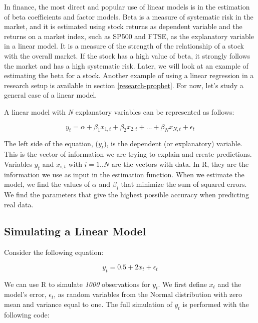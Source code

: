 \documentclass[11pt,]{book}
\begin{document}
In finance, the most direct and popular use of linear models is in the
estimation of beta coefficients and factor models. Beta is a measure of
systematic risk in the market, and it is estimated using stock returns
as dependent variable and the returns on a market index, such as SP500
and FTSE, as the explanatory variable in a linear model. It is a measure
of the strength of the relationship of a stock with the overall market.
If the stock has a high value of beta, it strongly follows the market
and has a high systematic risk. Later, we will look at an example of
estimating the beta for a stock. Another example of using a linear
regression in a research setup is available in section
\ref{research-prophet}. For now, let's study a general case of a linear
model.

A linear model with \emph{N} explanatory variables can be represented as
follows:

\[y _t = \alpha + \beta _1 x_{1,t} + \beta _2 x_{2,t} + ... + \beta _N x_{N,t} + \epsilon _t\]

The left side of the equation, (\(y_t\)), is the dependent (or
explanatory) variable. This is the vector of information we are trying
to explain and create predictions. Variables \(y_t\) and \(x_{i,t}\)
with \(i=1..N\) are the vectors with data. In R, they are the
information we use as input in the estimation function. When we estimate
the model, we find the values of \(\alpha\) and \(\beta _i\) that
minimize the sum of squared errors. We find the parameters that give the
highest possible accuracy when predicting real data.

\subsection{Simulating a Linear Model}\label{simulating-a-linear-model}

Consider the following equation:

\[y _t = 0.5 + 2 x_{t} + \epsilon _t\]

We can use R to simulate \emph{1000} observations for \(y_t\). We first
define \(x_t\) and the model's error, \(\epsilon _t\), as random
variables from the Normal distribution with zero mean and variance equal
to one. The full simulation of \(y_t\) is performed with the following
code:
\end{document}
